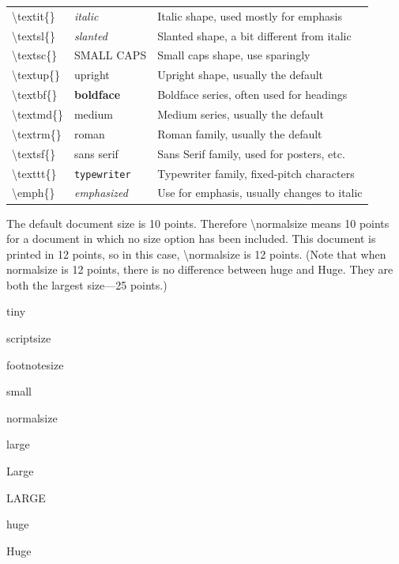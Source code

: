 \documentclass[12pt,openright]{book}
\begin{document}
\begin{center}
\begin{tabular}{|p{}p{}p{}|}
  \hline
  \textbackslash textit\{\} & \textit{italic} & Italic shape, used mostly for emphasis\\
  \textbackslash textsl\{\} & \textsl{slanted} & Slanted shape, a bit different from italic\\
  \textbackslash textsc\{\} & \textsc{SMALL CAPS} & Small caps shape, use sparingly\\
  \textbackslash textup\{\} & \textup{upright} & Upright shape, usually the default\\
  \textbackslash textbf\{\} & \textbf{boldface} & Boldface series, often used for headings\\
  \textbackslash textmd\{\} & \textmd{medium} & Medium series, usually the default\\
  \textbackslash textrm\{\} & \textrm{roman} & Roman family, usually the default\\
  \textbackslash textsf\{\} & \textsf{sans serif} & Sans Serif family, used for posters, etc.\\	
  \textbackslash texttt\{\} & \texttt{typewriter} & Typewriter family, fixed-pitch characters\\
  \textbackslash emph\{\} & \emph{emphasized} & Use for emphasis, usually changes to italic\\
  \hline	
\end{tabular}
\end{center}

The default document size is 10 points. Therefore \textbackslash normalsize means 10 points for a document in which no size option has been included. This document is printed in 12 points, so in this case, \textbackslash normalsize is 12 points. (Note that when normalsize is 12 points, there is no difference between huge and Huge. They are both the largest size—25 points.)

{\tiny tiny}

{\scriptsize scriptsize}

{\footnotesize footnotesize}

{\small small}

{\normalsize normalsize}

{\large large}

{\Large Large}

{\LARGE LARGE}

{\huge huge}

{\Huge Huge}
\end{document}
